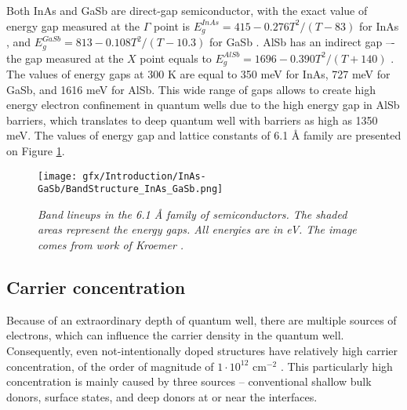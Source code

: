 \documentclass[titlepage,a4paper]{book}
\newcommand{\wciecie}{\quad\phantom{v}}
\begin{document}
Both InAs and GaSb are direct-gap semiconductor, with the exact value of energy gap measured at the $\Gamma$ point is $E_g^{InAs} = 415-0.276 T^2/(T-83)$ for InAs \cite{Fang_InAs}, and $E_g^{GaSb} = 813 - 0.108 T^2/(T-10.3)$ for GaSb \cite{Wu_GaSb}. AlSb has an indirect gap –- the gap measured at the $X$ point equals to $E_g^{AlSb} = 1696 - 0.390 T^2/(T+140)$ \cite{Vurgaftman_AlSb}. The values of energy gaps at 300 K are equal to 350 meV for InAs, 727 meV for GaSb, and 1616 meV for AlSb. This wide range of gaps allows to create high energy electron confinement in quantum wells due to the high energy gap in AlSb barriers, which translates to deep quantum well with barriers as high as 1350 meV. The values of energy gap and lattice constants of 6.1 Å family are presented on Figure \ref{fig:BandStructure_InAs_GaSb}.

\begin{figure}[ht]
	\centering
	\texttt{[image: gfx/Introduction/InAs-GaSb/BandStructure\_InAs\_GaSb.png]}
	\vspace{-10pt}
	\caption{\textit{Band lineups in the 6.1 Å family of semiconductors. The shaded areas represent the energy gaps. All energies are in eV. The image comes from work of Kroemer \cite{Kroemer_review}.}}
	\label{fig:BandStructure_InAs_GaSb}
\end{figure} 

\subsection{Carrier concentration}
\wciecie
Because of an extraordinary depth of quantum well, there are multiple sources of electrons, which can influence the carrier density in the quantum well. Consequently, even not-intentionally doped structures have relatively high carrier concentration, of the order of magnitude of $1 \cdot 10^{12}$ cm$^{-2}$ \cite{Tuttle_InAs_concentration}. This particularly high concentration is mainly caused by three sources -- conventional shallow bulk donors, surface states, and deep donors at or near the interfaces. 
\end{document}
